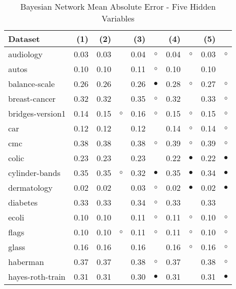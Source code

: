 \newpage
{\centering \footnotesize \begin{longtable}{lrr@{\hspace{0.1cm}}cr@{\hspace{0.1cm}}cr@{\hspace{0.1cm}}cr@{\hspace{0.1cm}}c}
\caption{\label{bnmae5}Bayesian Network Mean Absolute Error - Five Hidden Variables}
\\
\hline
Dataset & (1)& (2) & & (3) & & (4) & & (5) & \\
\hline
audiology & 0.03 & 0.03 &           & 0.04 &   $\circ$ & 0.04 &   $\circ$ & 0.03 &    $\circ$\\
autos & 0.10 & 0.10 &           & 0.11 &   $\circ$ & 0.10 &           & 0.10 &           \\
balance-scale & 0.26 & 0.26 &           & 0.26 & $\bullet$ & 0.28 &   $\circ$ & 0.27 &    $\circ$\\
breast-cancer & 0.32 & 0.32 &           & 0.35 &   $\circ$ & 0.32 &           & 0.33 &    $\circ$\\
bridges-version1 & 0.14 & 0.15 &   $\circ$ & 0.16 &   $\circ$ & 0.15 &   $\circ$ & 0.15 &    $\circ$\\
car & 0.12 & 0.12 &           & 0.12 &           & 0.14 &   $\circ$ & 0.14 &    $\circ$\\
cmc & 0.38 & 0.38 &           & 0.38 &   $\circ$ & 0.39 &   $\circ$ & 0.39 &    $\circ$\\
colic & 0.23 & 0.23 &           & 0.23 &           & 0.22 & $\bullet$ & 0.22 &  $\bullet$\\
cylinder-bands & 0.35 & 0.35 &   $\circ$ & 0.32 & $\bullet$ & 0.35 & $\bullet$ & 0.34 &  $\bullet$\\
dermatology & 0.02 & 0.02 &           & 0.03 &   $\circ$ & 0.02 & $\bullet$ & 0.02 &  $\bullet$\\
diabetes & 0.33 & 0.33 &           & 0.34 &   $\circ$ & 0.33 &           & 0.33 &           \\
ecoli & 0.10 & 0.10 &           & 0.11 &   $\circ$ & 0.11 &   $\circ$ & 0.10 &    $\circ$\\
flags & 0.10 & 0.10 &   $\circ$ & 0.11 &   $\circ$ & 0.11 &   $\circ$ & 0.10 &    $\circ$\\
glass & 0.16 & 0.16 &           & 0.16 &           & 0.16 &   $\circ$ & 0.16 &    $\circ$\\
haberman & 0.37 & 0.37 &           & 0.38 &   $\circ$ & 0.37 &           & 0.38 &    $\circ$\\
hayes-roth-train & 0.31 & 0.31 &           & 0.30 & $\bullet$ & 0.31 &           & 0.31 &  $\bullet$\\

\end{longtable}}
